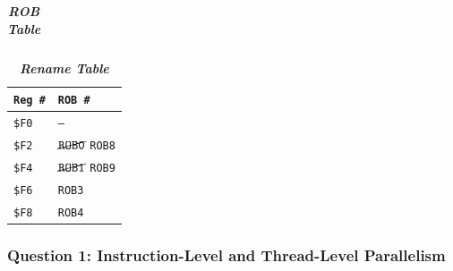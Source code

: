 \begin{enumerate}
\begin{table}[!htp]
\begin{adjustbox}{width={\textwidth},totalheight={\textheight},keepaspectratio}
\begin{tabular}{@{} l l l l l l @{}}
                \bottomrule
            \end{tabular}
        \end{adjustbox}
        \caption*{\emph{\textbf{ROB Table}}}
    \end{table}
    \begin{table}[!htp]
        \centering
        \begin{tabular}{@{} l l @{}}
            \toprule
            \texttt{Reg \#}  & \texttt{ROB \#} \\
            \midrule
            \texttt{\$F0}    & \texttt{--} \\ [.3em]
            \texttt{\$F2}    & $\cancel{\texttt{ROB0}}$ \texttt{ROB8} \\ [.3em]
            \texttt{\$F4}    & $\cancel{\texttt{ROB1}}$ \texttt{ROB9} \\ [.3em]
            \texttt{\$F6}    & \texttt{ROB3} \\ [.3em]
            \texttt{\$F8}    & \texttt{ROB4} \\
            \bottomrule
        \end{tabular}
        \caption*{\emph{\textbf{Rename Table}}}
    \end{table}
\end{enumerate}

\newpage

\subsubsection*{Question 1: Instruction-Level and Thread-Level Parallelism}


